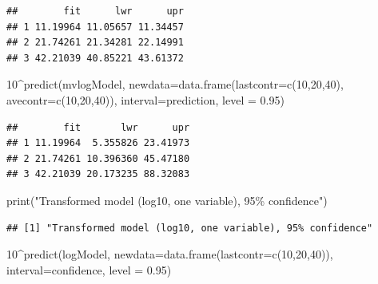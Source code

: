 \documentclass[
]{article}
\newenvironment{Shaded}{\begin{snugshade}}{\end{snugshade}}
\newcommand{\AttributeTok}[1]{\textcolor[rgb]{0.77,0.63,0.00}{#1}}
\newcommand{\DecValTok}[1]{\textcolor[rgb]{0.00,0.00,0.81}{#1}}
\newcommand{\FloatTok}[1]{\textcolor[rgb]{0.00,0.00,0.81}{#1}}
\newcommand{\FunctionTok}[1]{\textcolor[rgb]{0.00,0.00,0.00}{#1}}
\newcommand{\NormalTok}[1]{#1}
\newcommand{\SpecialCharTok}[1]{\textcolor[rgb]{0.00,0.00,0.00}{#1}}
\newcommand{\StringTok}[1]{\textcolor[rgb]{0.31,0.60,0.02}{#1}}
\begin{document}
\begin{verbatim}
##        fit      lwr      upr
## 1 11.19964 11.05657 11.34457
## 2 21.74261 21.34281 22.14991
## 3 42.21039 40.85221 43.61372
\end{verbatim}

\begin{Shaded}
\begin{Highlighting}[]
\DecValTok{10}\SpecialCharTok{\^{}}\FunctionTok{predict}\NormalTok{(mvlogModel,}
        \AttributeTok{newdata=}\FunctionTok{data.frame}\NormalTok{(}\AttributeTok{lastcontr=}\FunctionTok{c}\NormalTok{(}\DecValTok{10}\NormalTok{,}\DecValTok{20}\NormalTok{,}\DecValTok{40}\NormalTok{), }\AttributeTok{avecontr=}\FunctionTok{c}\NormalTok{(}\DecValTok{10}\NormalTok{,}\DecValTok{20}\NormalTok{,}\DecValTok{40}\NormalTok{)),}
        \AttributeTok{interval=}\StringTok{\textquotesingle{}prediction\textquotesingle{}}\NormalTok{,}
        \AttributeTok{level =} \FloatTok{0.95}\NormalTok{)}
\end{Highlighting}
\end{Shaded}

\begin{verbatim}
##        fit       lwr      upr
## 1 11.19964  5.355826 23.41973
## 2 21.74261 10.396360 45.47180
## 3 42.21039 20.173235 88.32083
\end{verbatim}

\begin{Shaded}
\begin{Highlighting}[]
\FunctionTok{print}\NormalTok{(}\StringTok{"Transformed model (log10, one variable), 95\% confidence"}\NormalTok{)}
\end{Highlighting}
\end{Shaded}

\begin{verbatim}
## [1] "Transformed model (log10, one variable), 95% confidence"
\end{verbatim}

\begin{Shaded}
\begin{Highlighting}[]
\DecValTok{10}\SpecialCharTok{\^{}}\FunctionTok{predict}\NormalTok{(logModel,}
        \AttributeTok{newdata=}\FunctionTok{data.frame}\NormalTok{(}\AttributeTok{lastcontr=}\FunctionTok{c}\NormalTok{(}\DecValTok{10}\NormalTok{,}\DecValTok{20}\NormalTok{,}\DecValTok{40}\NormalTok{)),}
        \AttributeTok{interval=}\StringTok{\textquotesingle{}confidence\textquotesingle{}}\NormalTok{,}
        \AttributeTok{level =} \FloatTok{0.95}\NormalTok{)}
\end{Highlighting}
\end{Shaded}
\end{document}
